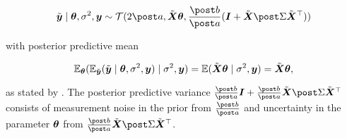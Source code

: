 \begin{equation*}
    \ty \mid \btheta, \ssd, \by \sim \Tcal(2 \apo, \tX \btheta, \frac{\bpo}{\apo} (\bI + \tX \Sdpo \tX^\top))
\end{equation*}

with posterior predictive mean

\begin{equation*}
    \mathbb{E}_{\bm{\theta}} ( \mathbb{E}_{\tilde{\bm{y}}} (\tilde{\bm{y}} \mid \bm{\theta}, \sigma^2, \bm{y}) \mid \sigma^2, \bm{y} ) = \mathbb{E} (\tilde{\bm{X}} \bm{\theta} \mid \sigma^2 , \bm{y}) = \tilde{\bm{X}} \bm{\theta},
\end{equation*}

as stated by \citet{gelman_bayesian_2013}. The posterior predictive variance $\frac{\bpo}{\apo} \bI + \frac{\bpo}{\apo} \tX \Sdpo \tX^\top$ consists of measurement noise in the prior from $\frac{\bpo}{\apo}$ and uncertainty in the parameter $\bm{\theta}$ from $\frac{\bpo}{\apo} \tX \Sdpo \tX^\top$. 